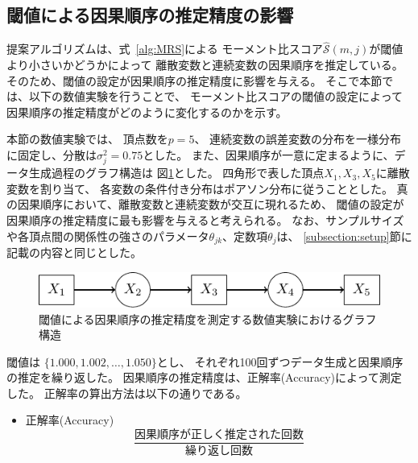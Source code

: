 
\subsection{閾値による因果順序の推定精度の影響}

提案アルゴリズムは、式~\eqref{alg:MRS}による
モーメント比スコア$\widehat{\mathcal S}(m,j)$が閾値より小さいかどうかによって
離散変数と連続変数の因果順序を推定している。
そのため、閾値の設定が因果順序の推定精度に影響を与える。
そこで本節では、以下の数値実験を行うことで、
モーメント比スコアの閾値の設定によって因果順序の推定精度がどのように変化するのかを示す。

本節の数値実験では、
頂点数を$p = 5$、
連続変数の誤差変数の分布を一様分布に固定し、分散は$\sigma_j^2 = 0.75$とした。
また、因果順序が一意に定まるように、データ生成過程のグラフ構造は
図\ref{fig:threshold}とした。
四角形で表した頂点$X_1,X_3,X_5$に離散変数を割り当て、
各変数の条件付き分布はポアソン分布に従うこととした。
真の因果順序において、離散変数と連続変数が交互に現れるため、
閾値の設定が因果順序の推定精度に最も影響を与えると考えられる。
なお、サンプルサイズや各頂点間の関係性の強さのパラメータ$\theta_{jk}$、定数項$\theta_j$は、
\ref{subsection:setup}節に記載の内容と同じとした。

\begin{figure}[ht]
  \centering
  \includegraphics{./picture/threshold.pdf}
  \caption{閾値による因果順序の推定精度を測定する数値実験におけるグラフ構造}
  \label{fig:threshold}
\end{figure}

閾値は $ \{ 1.000, 1.002, \dots, 1.050 \}$とし、
それぞれ100回ずつデータ生成と因果順序の推定を繰り返した。
因果順序の推定精度は、正解率(Accuracy)によって測定した。
正解率の算出方法は以下の通りである。
\begin{itemize}
  \item 正解率(Accuracy)
  \begin{equation*}
    \frac{\text{因果順序が正しく推定された回数}}{\text{繰り返し回数}}
  \end{equation*}
\end{itemize}

